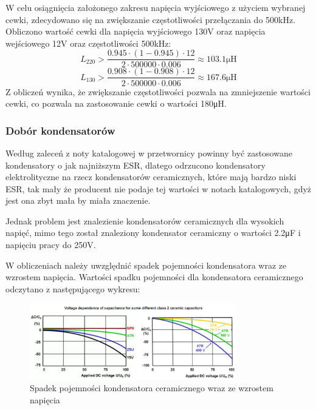 \documentclass[../../main.tex]{subfiles}
\begin{document}
W celu osiągnięcia założonego zakresu napięcia wyjściowego z użyciem wybranej cewki, zdecydowano się na zwiększanie częstotliwości przełączania do 500\si{\kilo\hertz}.
Obliczono wartość cewki dla napięcia wyjściowego 130\si{\volt} oraz napięcia wejściowego 12\si{\volt} oraz częstotliwości 500\si{\kilo\hertz}:
\begin{equation}
    L_{220} > \frac{0.945 \cdot (1-0.945) \cdot 12}{2 \cdot 500000 \cdot 0.006} \approx 103.1\si{\micro\henry}
\end{equation}
\begin{equation}
    L_{130} > \frac{0.908 \cdot (1-0.908) \cdot 12}{2 \cdot 500000 \cdot 0.006} \approx 167.6\si{\micro\henry}
\end{equation}
Z obliczeń wynika, że zwiększanie częstotliwości pozwala na zmniejszenie wartości cewki, co pozwala na zastosowanie cewki o wartości 180\si{\micro\henry}.

\subsubsection{Dobór kondensatorów}
Według zaleceń z noty katalogowej w przetwornicy powinny być zastosowane kondensatory o jak najniższym ESR,
dlatego odrzucono kondensatory elektrolityczne na rzecz kondensatorów ceramicznych, które mają bardzo niski ESR, tak
mały że producent nie podaje tej wartości w notach katalogowych, gdyż jest ona zbyt mała by miała znaczenie.

Jednak problem jest znalezienie kondensatorów ceramicznych dla wysokich napięć, mimo tego został znaleziony kondensator 
ceramiczny o wartości 2.2\si{\micro\farad} i napięciu pracy do 250\si{\volt}.

W obliczeniach należy uwzględnić spadek pojemności kondensatora wraz ze wzrostem napięcia.
Wartości spadku pojemności dla kondensatora ceramicznego odczytano z następującego wykresu:
\begin{figure}[H]
    \centering
    \includegraphics[width=0.8\textwidth]{napiecia_c.png}
    \caption{Spadek pojemności kondensatora ceramicznego wraz ze wzrostem napięcia}
\end{figure}
\end{document}
